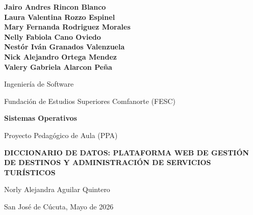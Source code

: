\documentclass[12pt,letterpaper]{article}
\begin{document}
\begin{titlepage}
    \centering
    \vspace*{0.5in}

    {\normalsize\bfseries
    Jairo Andres Rincon Blanco \\
    Laura Valentina Rozzo Espinel\\
    Mary Fernanda Rodriguez Morales\\
    Nelly Fabiola Cano Oviedo\\
    Nestór Iván Granados Valenzuela\\
    Nick Alejandro Ortega Mendez\\
    Valery Gabriela Alarcon Peña\\
    \par}
    \vspace{0.6in}

    {\normalsize Ingeniería de Software \par}
    \vspace{0.4in}

    {\normalsize Fundación de Estudios Superiores Comfanorte (FESC) \par}
    \vspace{0.6in}

    {\normalsize\bfseries Sistemas Operativos \par}
    \vspace{0.4in}

    {\normalsize Proyecto Pedagógico de Aula (PPA) \par}
    \vspace{0.5in}
    {\normalsize\bfseries DICCIONARIO DE DATOS: PLATAFORMA WEB DE GESTIÓN DE DESTINOS Y ADMINISTRACIÓN DE SERVICIOS TURÍSTICOS\par}
    \vspace{0.6in}

    {\normalsize Norly Alejandra Aguilar Quintero \par}

    \vfill
    {\normalsize San José de Cúcuta, Mayo de 2026 \par}
\end{titlepage}
\end{document}
